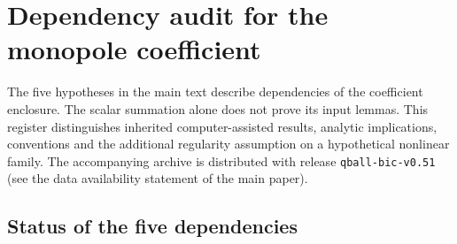 \section{Dependency audit for the monopole coefficient}
\label{supp:hypothesis-audit}
The five hypotheses in the main text describe dependencies of the
coefficient enclosure. The scalar summation alone does not prove its
input lemmas. This register distinguishes inherited computer-assisted
results, analytic implications, conventions and the additional
regularity assumption on a hypothetical nonlinear family. The
accompanying archive is distributed with release \texttt{qball-bic-v0.51}
(see the data availability statement of the main paper).

\subsection{Status of the five dependencies}
